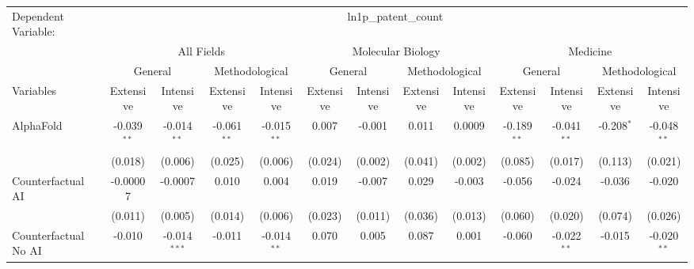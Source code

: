 \begingroup
\centering
\begin{tabular}{lcccccccccccc}
   \tabularnewline \midrule \midrule
   Dependent Variable: & \multicolumn{12}{c}{ln1p\_patent\_count}\\
 & \multicolumn{4}{c}{All Fields} & \multicolumn{4}{c}{Molecular Biology} & \multicolumn{4}{c}{Medicine} \\
\cmidrule(lr){2-5} \cmidrule(lr){6-9} \cmidrule(lr){10-13}
 & \multicolumn{2}{c}{General} & \multicolumn{2}{c}{Methodological} & \multicolumn{2}{c}{General} & \multicolumn{2}{c}{Methodological} & \multicolumn{2}{c}{General} & \multicolumn{2}{c}{Methodological} \\
\cmidrule(lr){2-3} \cmidrule(lr){4-5} \cmidrule(lr){6-7} \cmidrule(lr){8-9} \cmidrule(lr){10-11} \cmidrule(lr){12-13}
Variables & \multicolumn{1}{c}{Extensive} & \multicolumn{1}{c}{Intensive} & \multicolumn{1}{c}{Extensive} & \multicolumn{1}{c}{Intensive} & \multicolumn{1}{c}{Extensive} & \multicolumn{1}{c}{Intensive} & \multicolumn{1}{c}{Extensive} & \multicolumn{1}{c}{Intensive} & \multicolumn{1}{c}{Extensive} & \multicolumn{1}{c}{Intensive} & \multicolumn{1}{c}{Extensive} & \multicolumn{1}{c}{Intensive} \\
\cmidrule(lr){1-1}\cmidrule(lr){2-2} \cmidrule(lr){3-3} \cmidrule(lr){4-4} \cmidrule(lr){5-5} \cmidrule(lr){6-6} \cmidrule(lr){7-7} \cmidrule(lr){8-8} \cmidrule(lr){9-9} \cmidrule(lr){10-10} \cmidrule(lr){11-11} \cmidrule(lr){12-12} \cmidrule(lr){13-13}
   AlphaFold                                & -0.039$^{**}$ & -0.014$^{**}$  & -0.061$^{**}$ & -0.015$^{**}$ & 0.007   & -0.001   & 0.011   & 0.0009   & -0.189$^{**}$ & -0.041$^{**}$ & -0.208$^{*}$ & -0.048$^{**}$\\   
                                            & (0.018)       & (0.006)        & (0.025)       & (0.006)       & (0.024) & (0.002)  & (0.041) & (0.002)  & (0.085)       & (0.017)       & (0.113)      & (0.021)\\   
   Counterfactual AI                        & -0.00007      & -0.0007        & 0.010         & 0.004         & 0.019   & -0.007   & 0.029   & -0.003   & -0.056        & -0.024        & -0.036       & -0.020\\   
                                            & (0.011)       & (0.005)        & (0.014)       & (0.006)       & (0.023) & (0.011)  & (0.036) & (0.013)  & (0.060)       & (0.020)       & (0.074)      & (0.026)\\   
   Counterfactual No AI                     & -0.010        & -0.014$^{***}$ & -0.011        & -0.014$^{**}$ & 0.070   & 0.005    & 0.087   & 0.001    & -0.060        & -0.022$^{**}$ & -0.015       & -0.020$^{**}$\\   

\end{tabular}
